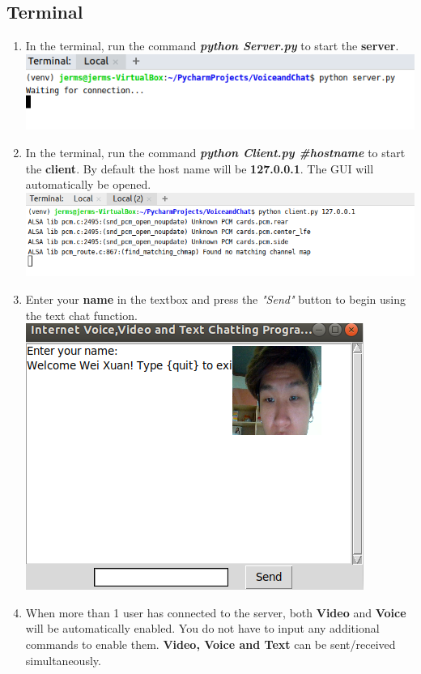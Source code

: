 \documentclass[a4paper,11pt]{article}
\begin{document}
\subsection{Terminal}
\begin{enumerate}
  \item In the terminal, run the command \textbf{\textit{python Server.py}} to start the \textbf{server}.
  \newline
  \includegraphics{server}
  \item In the terminal, run the command \textbf{\textit{python Client.py \#hostname }}to start the \textbf{client}. By default the host name will be \textbf{127.0.0.1}. The GUI will automatically be opened.
  \newline
  \includegraphics{client}
  \item Enter your \textbf{name} in the textbox and press the \textit{"Send"} button to begin using the text chat function.
  \newline
  \includegraphics{name}
   \item When more than 1 user has connected to the server, both \textbf{Video} and \textbf{Voice} will be automatically enabled. You do not have to input any additional commands to enable them. \textbf{Video, Voice and Text} can be sent/received simultaneously.

\end{enumerate}
\end{document}
